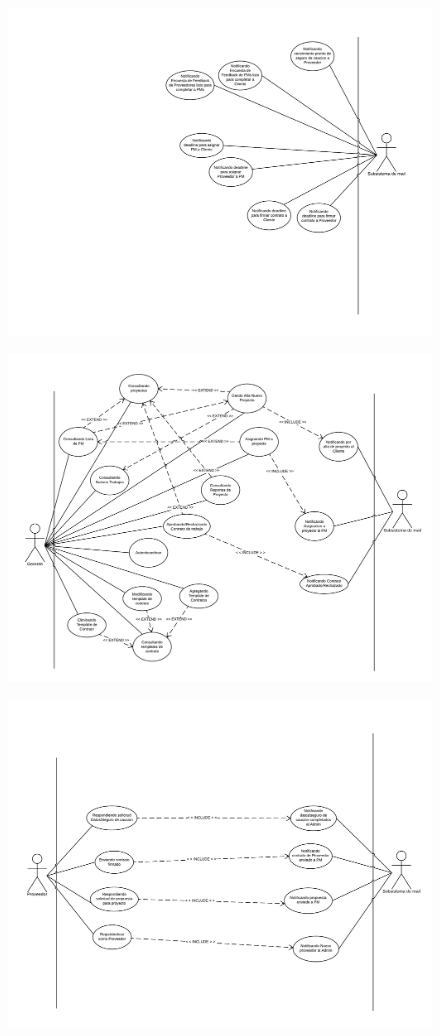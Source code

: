 \begin{figure}[H]
\includegraphics[width=\linewidth]{diag/viejos/cu3.pdf}
\end{figure}
\begin{figure}[H]
\includegraphics[width=\linewidth]{diag/viejos/cu4.pdf}
\end{figure}
\begin{figure}[H]
\includegraphics[width=\linewidth]{diag/viejos/cu5.pdf}
\end{figure}
